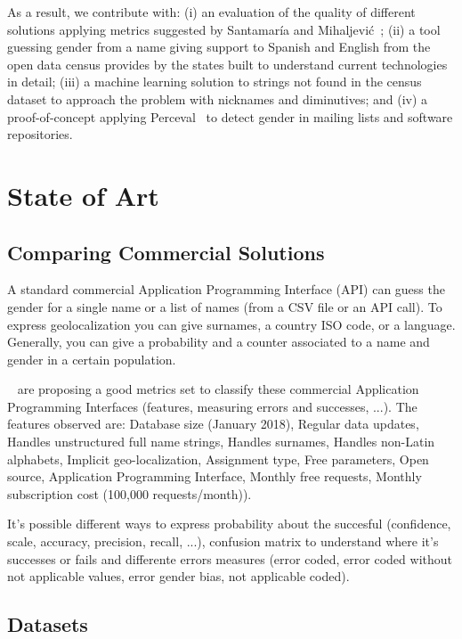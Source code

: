 \documentclass[a4paper]{article}
\begin{document}
As a result, we contribute with: 
(i) an evaluation of the quality of different solutions applying metrics
  suggested by Santamaría and Mihaljević~\cite{10.7717/peerj-cs.156};
(ii) a tool guessing gender from a name giving support to Spanish and
  English from the open data census provides by the states built to understand 
  current technologies in detail;
(iii) a machine learning solution to strings not found in the
  census dataset to approach the problem with nicknames and diminutives; and 
(iv) a proof-of-concept applying Perceval~\cite{duenas2018perceval} to detect
  gender in mailing lists and software repositories.



\section{State of Art}

\subsection{Comparing Commercial Solutions}

A standard commercial Application Programming Interface (API) can
guess the gender for a single name or a list of names (from a CSV file
or an API call). To express geolocalization you can give surnames, a
country ISO code, or a language. Generally, you can give a probability
and a counter associated to a name and gender in a certain population.

~\cite{10.7717/peerj-cs.156} are proposing a good metrics set to
classify these commercial Application Programming Interfaces
(features, measuring errors and successes, ...). The features observed
are: Database size (January 2018), Regular data updates, Handles
unstructured full name strings, Handles surnames, Handles non-Latin
alphabets, Implicit geo-localization, Assignment type, Free
parameters, Open source, Application Programming Interface, Monthly
free requests, Monthly subscription cost (100,000 requests/month)).

It's possible different ways to express probability about the
succesful (confidence, scale, accuracy, precision, recall, ...),
confusion matrix to understand where it's successes or fails and
differente errors measures (error coded, error coded without not
applicable values, error gender bias, not applicable coded).

\subsection{Datasets}
\end{document}

